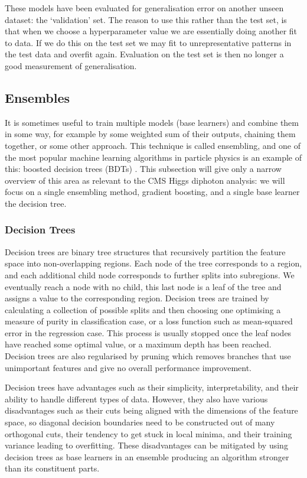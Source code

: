 These models have been evaluated for generalisation error on another unseen dataset: the `validation' set. The reason to use this rather than the test set, is that when we choose a hyperparameter value we are essentially doing another fit to data. If we do this on the test set we may fit to unrepresentative patterns in the test data and overfit again. Evaluation on the test set is then no longer a good measurement of generalisation. 








\subsection{Ensembles}

It is sometimes useful to train multiple models (base learners) and combine them in some way, for example by some weighted sum of their outputs, chaining them together, or some other approach. This technique is called ensembling, and one of the most popular machine learning algorithms in particle physics is an example of this: boosted decision trees (BDTs) \cite{MiniBooneBDT}. This subsection will give only a narrow overview of this area as relevant to the CMS Higgs diphoton analysis: we will focus on a single ensembling method, gradient boosting, and a single base learner the decision tree.


\subsubsection{Decision Trees}
Decision trees \cite{DecisionTrees} are binary tree structures that recursively partition the feature space into non-overlapping regions. Each node of the tree corresponds to a region, and each additional child node corresponds to further splits into subregions. We eventually reach a node with no child, this last node is a leaf of the tree and assigns a value to the corresponding region.  
Decision trees are trained by calculating a collection of possible splits and then choosing one optimising a measure of purity in classification case, or a loss function such as mean-squared error in the regression case. This process is usually stopped once the leaf nodes have reached some optimal value, or a maximum depth has been reached. 
Decision trees are also regularised by pruning which removes branches that use unimportant features and give no overall performance improvement. 

Decision trees have advantages such as their simplicity, interpretability, and their ability to handle different types of data. However, they also have various disadvantages such as their cuts being aligned with the dimensions of the feature space, so diagonal decision boundaries need to be constructed out of many orthogonal cuts, their tendency to get stuck in local minima, and their training variance leading to overfitting. These disadvantages can be mitigated by using decision trees as base learners in an ensemble producing an algorithm stronger than its constituent parts. 

